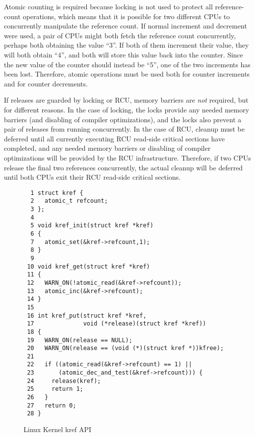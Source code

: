 Atomic counting is required
because locking is not used to protect all reference-count operations,
which means that it is possible for two different CPUs to concurrently
manipulate the reference count.
If normal increment and decrement were used, a pair of CPUs might both
fetch the reference count concurrently, perhaps both obtaining
the value ``3''.
If both of them increment their value, they will both obtain ``4'',
and both will store this value back into the counter.
Since the new value of the counter should instead be ``5'', one
of the two increments has been lost.
Therefore, atomic operations must be used both for counter increments
and for counter decrements.

If releases are guarded by locking or RCU,
memory barriers are \emph{not} required, but for different reasons.
In the case of locking, the locks provide any needed memory barriers
(and disabling of compiler optimizations), and the locks also
prevent a pair of releases from running concurrently.
In the case of RCU, cleanup must be deferred until all currently
executing RCU read-side critical sections have completed, and
any needed memory barriers or disabling of compiler optimizations
will be provided by the RCU infrastructure.
Therefore, if two CPUs release the final two references concurrently,
the actual cleanup will be deferred until both CPUs exit their
RCU read-side critical sections.

 \QuickQuizEnd

\begin{figure}[htbp]
{ \scriptsize
\begin{verbatim}
  1 struct kref {
  2   atomic_t refcount;
  3 };
  4 
  5 void kref_init(struct kref *kref)
  6 {
  7   atomic_set(&kref->refcount,1);
  8 }
  9 
 10 void kref_get(struct kref *kref)
 11 {
 12   WARN_ON(!atomic_read(&kref->refcount));
 13   atomic_inc(&kref->refcount);
 14 }
 15 
 16 int kref_put(struct kref *kref,
 17              void (*release)(struct kref *kref))
 18 {
 19   WARN_ON(release == NULL);
 20   WARN_ON(release == (void (*)(struct kref *))kfree);
 21 
 22   if ((atomic_read(&kref->refcount) == 1) ||
 23       (atomic_dec_and_test(&kref->refcount))) {
 24     release(kref);
 25     return 1;
 26   }
 27   return 0;
 28 }
\end{verbatim}
}
\caption{Linux Kernel kref API}
\label{fig:defer:Linux Kernel kref API}
\end{figure}

